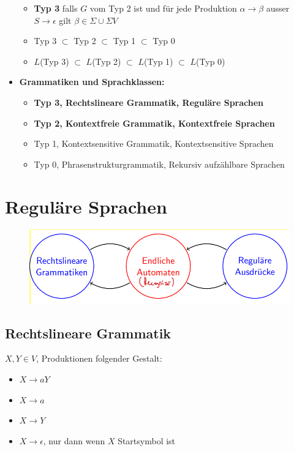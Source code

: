 \documentclass[ieeetran]{article}
\begin{document}
\begin{itemize}
\begin{itemize}
\item \textbf{Typ 3} falls $G$ vom Typ 2 ist und für jede Produktion $\alpha \rightarrow \beta$ ausser $S \rightarrow \epsilon$ gilt
$\beta \in \Sigma \cup \Sigma V$

\item Typ 3 $\subset$ Typ 2 $\subset$ Typ 1 $\subset$ Typ 0
\item $L$(Typ 3) $\subset$ $L$(Typ 2) $\subset$ $L$(Typ 1) $\subset$ $L$(Typ 0)
 
\end{itemize}
\pagebreak

\item \textbf{Grammatiken und Sprachklassen:}
	\begin{itemize}
		\item \textbf{Typ 3, Rechtslineare Grammatik, Reguläre Sprachen} 
		\item \textbf{Typ 2, Kontextfreie Grammatik, Kontextfreie Sprachen} 
	\item Typ 1, Kontextsensitive Grammatik, Kontextsensitive Sprachen
		\item Typ 0, Phrasenstrukturgrammatik, Rekursiv aufzählbare Sprachen
	\end{itemize}
\end{itemize}


\section{Reguläre Sprachen} %
\label{sec:reguläre_sprachen}

\begin{figure}[h!]
  \centering
  \includegraphics[width=0.5\linewidth]{regausgram.png}
  \label{fig:regausgram_png}
\end{figure}

\subsection{Rechtslineare Grammatik} %
\label{sub:rechtslineare_grammatik}
$X,Y \in V$, Produktionen folgender Gestalt:
\begin{itemize}
  \item $X \rightarrow aY$
\item $X \rightarrow a$

\item $X \rightarrow Y$
\item $X \rightarrow \epsilon$, nur dann wenn $X$ Startsymbol ist
\end{itemize}
\end{document}
